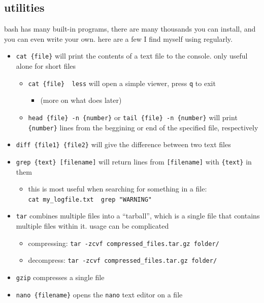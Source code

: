 \documentclass[
]{article}
\providecommand{\tightlist}{%
  \setlength{\itemsep}{0pt}\setlength{\parskip}{0pt}}
\begin{document}
\hypertarget{utilities}{%
\subsection{utilities}\label{utilities}}

bash has many built-in programs, there are many thousands you can
install, and you can even write your own. here are a few I find myself
using regularly.

\begin{itemize}
\tightlist
\item
  \texttt{cat\ \{file\}} will print the contents of a text file to the
  console. only useful alone for short files

  \begin{itemize}
  \tightlist
  \item
    \texttt{cat\ \{file\}\ \textbar{}\ less} will open a simple viewer,
    press \texttt{q} to exit

    \begin{itemize}
    \tightlist
    \item
      (more on what \texttt{\textbar{}} does later)
    \end{itemize}
  \item
    \texttt{head\ \{file\}\ -n\ \{number\}} or
    \texttt{tail\ \{file\}\ -n\ \{number\}} will print
    \texttt{\{number\}} lines from the beggining or end of the specified
    file, respectively
  \end{itemize}
\item
  \texttt{diff\ \{file1\}\ \{file2\}} will give the difference between
  two text files
\item
  \texttt{grep\ \{text\}\ {[}filename{]}} will return lines from
  \texttt{{[}filename{]}} with \texttt{\{text\}} in them

  \begin{itemize}
  \tightlist
  \item
    this is most useful when searching for something in a file:\\
    \texttt{cat\ my\_logfile.txt\ \textbar{}\ grep\ "WARNING"}
  \end{itemize}
\item
  \texttt{tar} combines multiple files into a ``tarball'', which is a
  single file that contains multiple files within it. usage can be
  complicated

  \begin{itemize}
  \tightlist
  \item
    compressing: \texttt{tar\ -zcvf\ compressed\_files.tar.gz\ folder/}
  \item
    decompress: \texttt{tar\ -zcvf\ compressed\_files.tar.gz\ folder/}
  \end{itemize}
\item
  \texttt{gzip} compresses a single file
\item
  \texttt{nano\ \{filename\}} opens the \texttt{nano} text editor on a
  file


\end{itemize}
\end{document}
